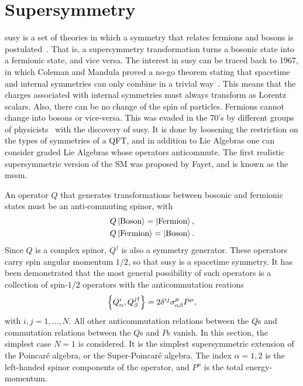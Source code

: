 \clearpage
\section{Supersymmetry}

\gls{susy} is a set of theories in which a symmetry that relates fermions and bosons is postulated~\cite{Peskin2019-bt,Garrett_2011,MARTIN_1998}. That is, a supersymmetry transformation turns a bosonic state into a fermionic state, and vice versa. The interest in \gls{susy} can be traced back to 1967, in which Coleman and Mandula proved a no-go theorem stating that spacetime and internal symmetries can only combine in a trivial way~\cite{PhysRev.159.1251}. This means that the charges associated with internal symmetries must always transform as Lorentz scalars. Also, there can be no change of the spin of particles. Fermions cannot change into bosons or vice-versa. This was evaded in the 70's by different groups of physicists~\cite{GERVAIS1971632,HAAG1975257} with the discovery of \gls{susy}. It is done by loosening the restriction on the types of symmetries of a QFT, and in addition to Lie Algebras one can consider graded Lie Algebras whose operators anticommute. The first realistic supersymmetric version of the SM was proposed by Fayet, and is known as the \gls{mssm}.

An operator $Q$ that generates transformations between bosonic and fermionic states must be an anti-commuting spinor, with
\begin{equation}
\begin{split}
Q\ket{\text{Boson}}=\ket{\text{Fermion}},\\
Q\ket{\text{Fermion}}=\ket{\text{Boson}}.
\end{split}
\end{equation}
Since $Q$ is a complex spinor, $Q^\dagger$ is also a symmetry generator. These operators carry spin angular momentum $1/2$, so that \gls{susy} is a spacetime symmetry. It has been demonstrated that the most general possibility of such operators is a collection of spin-$1/2$ operators with the anticommutation reations
\begin{equation}
\pb{Q^i_\alpha}{Q^{j\dagger}_\beta}=2\delta^{ij}\sigma^\mu_{\alpha\beta}P^\mu,
\end{equation}
with $i,j=1,\ldots,N$. All other anticommutation relations between the $Q$s and commutation relations between the $Q$s and $P$s vanish. In this section, the simplest case $N=1$ is considered. It is the simplest supersymmetric extension of the Poincaré algebra, or the Super-Poincaré algebra. The index $\alpha=1,2$ is the left-handed spinor components of the operator, and $P^\mu$ is the total energy-momentum. 

